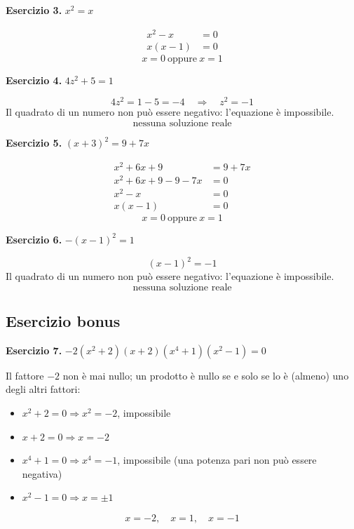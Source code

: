 \documentclass[11pt]{report}
\newcommand{\eserc}[1]{\bigskip\noindent\textbf{Esercizio #1.}\quad}
\begin{document}
\eserc{3} $x^2=x$

\begin{align*}
x^2-x &=0\\
x(x-1)&=0
\end{align*}
\[
\boxed{x=0 \ \text{oppure}\ x=1}
\]

\eserc{4} $4z^2+5=1$

\[
4z^2=1-5=-4 \quad\Rightarrow\quad z^2=-1
\]
Il quadrato di un numero non può essere negativo: l'equazione è impossibile.
\[
\boxed{\text{nessuna soluzione reale}}
\]

\eserc{5} $(x+3)^2=9+7x$

\begin{align*}
x^2+6x+9 &= 9+7x\\
x^2+6x+9-9-7x &=0\\
x^2-x &=0\\
x(x-1)&=0
\end{align*}
\[
\boxed{x=0 \ \text{oppure}\ x=1}
\]

\eserc{6} $-(x-1)^2=1$

\[
(x-1)^2=-1
\]
Il quadrato di un numero non può essere negativo: l'equazione è impossibile.
\[
\boxed{\text{nessuna soluzione reale}}
\]

\subsection*{Esercizio bonus}

\eserc{7} $-2(x^2+2)(x+2)(x^4+1)(x^2-1)=0$

Il fattore $-2$ non è mai nullo; un prodotto è nullo se e solo se lo è (almeno) uno degli altri fattori:
\begin{itemize}
\item $x^2+2=0 \Rightarrow x^2=-2$, impossibile
\item $x+2=0 \Rightarrow x=-2$
\item $x^4+1=0 \Rightarrow x^4=-1$, impossibile (una potenza pari non può essere negativa)
\item $x^2-1=0 \Rightarrow x=\pm1$
\end{itemize}
\[
\boxed{x=-2,\quad x=1,\quad x=-1}
\]
\end{document}
